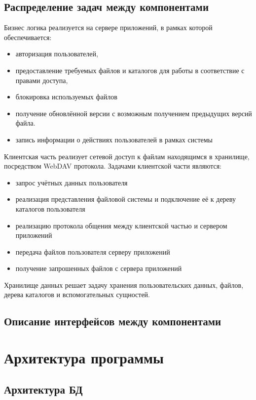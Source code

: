 \documentclass[utf8,usehyperref,12pt]{G7-32}
\begin{document}
\subsection{Распределение задач между компонентами}
Бизнес логика реализуется на сервере приложений, в рамках которой обеспечивается:
\begin{itemize}
\item авторизация пользователей, 
\item предоставление требуемых файлов и каталогов для работы в соответствие с правами доступа, 
\item блокировка используемых файлов 
\item получение обновлённой версии с возможным получением предыдущих версий файла.
\item запись информации о действиях пользователей в рамках системы
 \end{itemize}
 
Клиентская часть реализует сетевой доступ к файлам находящимся в хранилище, посредством WebDAV протокола. Задачами клиентской части являются:
\begin{itemize}
\item запрос учётных данных пользователя
\item реализация представления файловой системы и подключение её к дереву каталогов пользователя
\item реализацию протокола общения между клиентской частью и сервером приложений
\item передача файлов пользователя серверу приложений
\item получение запрошенных файлов с сервера приложений
\end{itemize}

Хранилище данных решает задачу хранения пользовательских данных, файлов, дерева каталогов и вспомогательных сущностей.
\subsection{Описание интерфейсов между компонентами}

\section{Архитектура программы}
\subsection{Архитектура БД}
\end{document}
